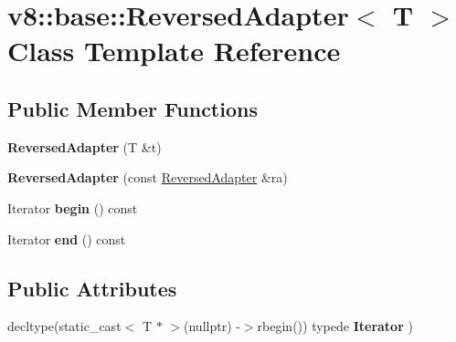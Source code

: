 \hypertarget{classv8_1_1base_1_1_reversed_adapter}{}\section{v8\+:\+:base\+:\+:Reversed\+Adapter$<$ T $>$ Class Template Reference}
\label{classv8_1_1base_1_1_reversed_adapter}
\subsection*{Public Member Functions}
\begin{DoxyCompactItemize}
\item 
{\bfseries Reversed\+Adapter} (T \&t)\hypertarget{classv8_1_1base_1_1_reversed_adapter_ad9fc47e5e56425656e5c2b9817edf28d}{}\label{classv8_1_1base_1_1_reversed_adapter_ad9fc47e5e56425656e5c2b9817edf28d}

\item 
{\bfseries Reversed\+Adapter} (const \hyperlink{classv8_1_1base_1_1_reversed_adapter}{Reversed\+Adapter} \&ra)\hypertarget{classv8_1_1base_1_1_reversed_adapter_a5dbe57938f55d23e91ed72b695d2061a}{}\label{classv8_1_1base_1_1_reversed_adapter_a5dbe57938f55d23e91ed72b695d2061a}

\item 
Iterator {\bfseries begin} () const \hypertarget{classv8_1_1base_1_1_reversed_adapter_a18ca5ad8a70e489dcbbbe6c4ae0b603d}{}\label{classv8_1_1base_1_1_reversed_adapter_a18ca5ad8a70e489dcbbbe6c4ae0b603d}

\item 
Iterator {\bfseries end} () const \hypertarget{classv8_1_1base_1_1_reversed_adapter_a1acf11773e44a7c1da22341f72d1084f}{}\label{classv8_1_1base_1_1_reversed_adapter_a1acf11773e44a7c1da22341f72d1084f}

\end{DoxyCompactItemize}
\subsection*{Public Attributes}
\begin{DoxyCompactItemize}
\item 
decltype(static\+\_\+cast$<$ T $\ast$ $>$(nullptr) -\/$>$rbegin()) typede {\bfseries Iterator} )\hypertarget{classv8_1_1base_1_1_reversed_adapter_a37468b99f55fee058f237c49b677981f}{}\label{classv8_1_1base_1_1_reversed_adapter_a37468b99f55fee058f237c49b677981f}

\end{DoxyCompactItemize}
